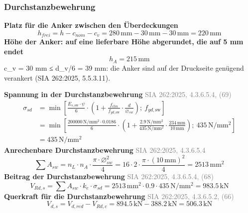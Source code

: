 \documentclass[11pt,a4paper]{article}
\newcommand{\normref}[1]{{\small\textcolor{gray}{#1}}}
\begin{document}
\subsubsection{Durchstanzbewehrung}
\noindent\textbf{Platz für die Anker zwischen den Überdeckungen}
\begin{equation*}
h_{frei} = h - c_{nom} - c_v = 280\,\mathrm{mm} - 30\,\mathrm{mm} - 30\,\mathrm{mm} = 220\,\mathrm{mm}
\end{equation*}
\noindent\textbf{Höhe der Anker: auf eine lieferbare Höhe abgerundet, die auf 5 mm endet}
\begin{equation*}
h_A = 215\,\mathrm{mm}
\end{equation*}
c\_v = 30 mm ≤ d\_v/6 = 39 mm: die Anker sind auf der Druckseite genügend verankert (SIA 262:2025, 5.5.3.11).

\noindent\textbf{Spannung in der Durchstanzbewehrung} \hfill \normref{SIA 262:2025, 4.3.6.5.4, (69)}
\begin{equation*}
\begin{aligned}
  \sigma_{sd} &= \min\left[\frac{E_{s,\text{sw}} \cdot \psi}{6} \cdot \left(1 + \frac{f_{ctm}}{f_{yd,\text{sw}}} \cdot \frac{d}{\varnothing_{sw}}\right);\ f_{yd,\text{sw}}\right] \\
  &= \min\left[\frac{200000\,\mathrm{N}/\mathrm{mm}^{2} \cdot 0.0186}{6} \cdot \left(1 + \frac{2.9\,\mathrm{N}/\mathrm{mm}^{2}}{435\,\mathrm{N}/\mathrm{mm}^{2}} \cdot \frac{234\,\mathrm{mm}}{10\,\mathrm{mm}}\right);\ 435\,\mathrm{N}/\mathrm{mm}^{2}\right] \\
  &= 435\,\mathrm{N}/\mathrm{mm}^{2}
\end{aligned}
\end{equation*}
\noindent\textbf{Anrechenbare Durchstanzbewehrung} \hfill \normref{SIA 262:2025, 4.3.6.5.4}
\begin{equation*}
\sum A_{sw} = n_L \cdot n_A \cdot \frac{\pi \cdot \varnothing_{sw}^{2}}{4} = 16 \cdot 2 \cdot \frac{\pi \cdot \left(10\,\mathrm{mm}\right)^{2}}{4} = 2513\,\mathrm{mm}^{2}
\end{equation*}
\noindent\textbf{Beitrag der Durchstanzbewehrung} \hfill \normref{SIA 262:2025, 4.3.6.5.4, (68)}
\begin{equation*}
V_{Rd,s} = \sum A_{sw} \cdot k_e \cdot \sigma_{sd} = 2513\,\mathrm{mm}^{2} \cdot 0.9 \cdot 435\,\mathrm{N}/\mathrm{mm}^{2} = 983.5\,\mathrm{kN}
\end{equation*}
\noindent\textbf{Querkraft für die Durchstanzbewehrung} \hfill \normref{SIA 262:2025, 4.3.6.5.2, (66)}
\begin{equation*}
V_{d,s} = V_{d,red} - V_{Rd,c} = 894.5\,\mathrm{kN} - 388.2\,\mathrm{kN} = 506.3\,\mathrm{kN}
\end{equation*}
\end{document}
